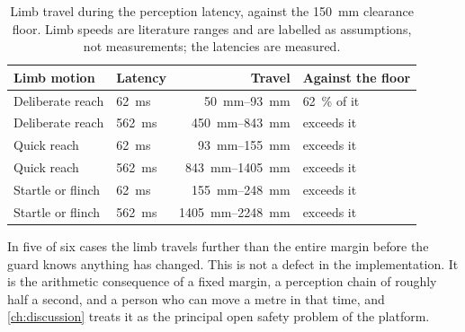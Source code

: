 \begin{table}[htbp]
  \centering
  \caption[Reaction budget]{Limb travel during the perception latency, against
  the \SI{150}{\milli\metre} clearance floor. Limb speeds are literature
  ranges and are labelled as assumptions, not measurements; the latencies are
  measured.}
  \label{tab:reaction}
  \begin{tabular}{@{}llrl@{}}
    \toprule
    Limb motion & Latency & Travel & Against the floor \\
    \midrule
    Deliberate reach & \SI{62}{\milli\second} & \SIrange{50}{93}{\milli\metre} & \SI{62}{\percent} of it \\
    Deliberate reach & \SI{562}{\milli\second} & \SIrange{450}{843}{\milli\metre} & exceeds it \\
    Quick reach & \SI{62}{\milli\second} & \SIrange{93}{155}{\milli\metre} & exceeds it \\
    Quick reach & \SI{562}{\milli\second} & \SIrange{843}{1405}{\milli\metre} & exceeds it \\
    Startle or flinch & \SI{62}{\milli\second} & \SIrange{155}{248}{\milli\metre} & exceeds it \\
    Startle or flinch & \SI{562}{\milli\second} & \SIrange{1405}{2248}{\milli\metre} & exceeds it \\
    \bottomrule
  \end{tabular}
\end{table}

In five of six cases the limb travels further than the entire margin before
the guard knows anything has changed. This is not a defect in the
implementation. It is the arithmetic consequence of a fixed margin, a
perception chain of roughly half a second, and a person who can move a metre
in that time, and \cref{ch:discussion} treats it as the principal open safety
problem of the platform.
